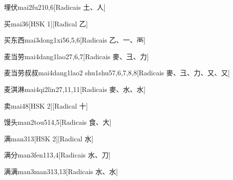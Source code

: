 \begin{entry}{埋伏}{mai2fu2}{10,6}[Radicais ⼟、⼈]
\end{entry}

\begin{entry}{买}{mai3}{6}[HSK 1][Radical ⼄]
\end{entry}

\begin{entry}{买东西}{mai3dong1xi5}{6,5,6}[Radicais ⼄、⼀、⾑]
\end{entry}

\begin{entry}{麦当劳}{mai4dang1lao2}{7,6,7}[Radicais ⿆、⼹、⼒]
\end{entry}

\begin{entry}{麦当劳叔叔}{mai4dang1lao2 shu1shu5}{7,6,7,8,8}[Radicais ⿆、⼹、⼒、⼜、⼜]
\end{entry}

\begin{entry}{麦淇淋}{mai4qi2lin2}{7,11,11}[Radicais ⿆、⽔、⽔]
\end{entry}

\begin{entry}{卖}{mai4}{8}[HSK 2][Radical ⼗]
\end{entry}

\begin{entry}{馒头}{man2tou5}{14,5}[Radicais ⾷、⼤]
\end{entry}

\begin{entry}{满}{man3}{13}[HSK 2][Radical ⽔]
\end{entry}

\begin{entry}{满分}{man3fen1}{13,4}[Radicais ⽔、⼑]
\end{entry}

\begin{entry}{满满}{man3man3}{13,13}[Radicais ⽔、⽔]
\end{entry}

